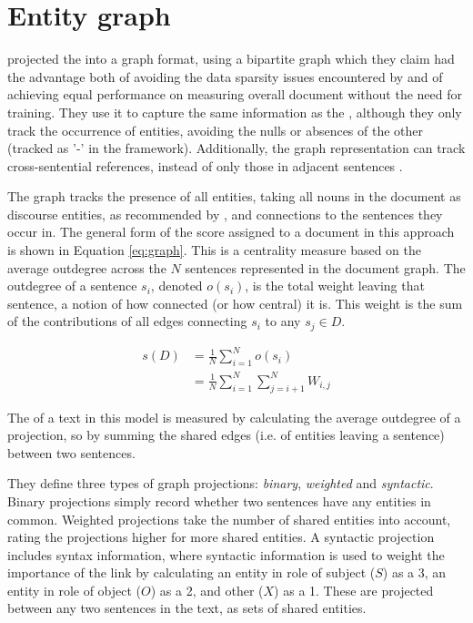 \documentclass[output=paper]{langsci/langscibook.cls}
\begin{document}
\section{Entity graph}\label{entity_graph}

\citet{Guinaudeau} projected the  into a graph format, using a bipartite graph which they claim had the advantage both of avoiding the data sparsity issues encountered by \citet{Barzilay:2008} and of achieving equal performance on measuring overall document  without the need for training. They use it to capture the same  information as the  , although they only track the occurrence of entities, avoiding the nulls or absences of the other (tracked as '-' in the  framework). Additionally, the graph representation can track cross-sentential references, instead of only those in adjacent sentences \citep{Guinaudeau}.

The graph tracks the presence of all entities, taking all nouns in the document as discourse entities, as recommended by \citet{Elsner:2011}, and connections to the sentences they occur in. 
The general form of the  score assigned to a document in this approach is shown in Equation \ref{eq:graph}.
This is a centrality measure based on the average outdegree across the $N$ sentences represented in the document graph. 
The outdegree of a sentence $s_i$, denoted $o(s_i)$, is the total weight leaving that sentence, a notion of how connected (or how central) it is.
This weight is the sum of the contributions of all edges connecting $s_i$ to any $s_j \in D$.


\vspace{-3mm}
\begin{align}\label{eq:graph}
 	s(D) &=  \frac{1}{N} \sum_{i=1}^N o(s_i) \\ \nonumber
	&= \frac{1}{N} \sum_{i=1}^N \sum_{j=i+1}^N W_{i,j} 
\end{align}

The  of a text in this model is measured by calculating the average outdegree of a projection, so by summing the shared edges (i.e. of entities leaving a sentence) between two sentences.

They define three types of graph projections: {\em binary}, {\em weighted} and {\em syntactic}. 
Binary projections simply record whether two sentences have any entities in common. Weighted projections take the number of shared entities into account, rating the projections higher for more shared entities. A syntactic projection includes syntax information, where syntactic information is used to weight the importance of the link by calculating an entity in role of subject ($S$) as a 3, an entity in role of object ($O$) as a 2, and other ($X$) as a 1. These are projected between any two sentences in the text, as sets of shared entities. 
\end{document}
